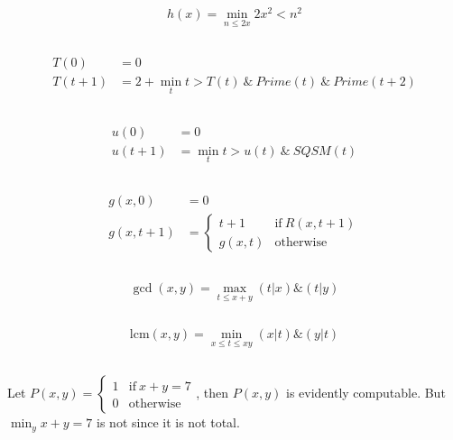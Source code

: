 \subsection{}
\[ h(x) = \min_{n\le 2x}{2x^2<n^2} \]

\subsection{}
\begin{align*}
  T(0)   & = 0 \\
  T(t+1) & = 2 + \min_{t}t>T(t) \ \&\ Prime(t) \ \&\ Prime(t+2)
\end{align*}


\subsection{}
\begin{align*}
  u(0)   & = 0 \\
  u(t+1) & = \min_{t}t>u(t) \ \&\ SQSM(t)
\end{align*}


\subsection{}
\begin{align*}
  g(x,0)   & = 0 \\
  g(x,t+1) & = 
    \begin{cases}
      t+1    & \mathrm{if}\ R(x,t+1) \\
      g(x,t) & \mathrm{otherwise}
    \end{cases}
\end{align*}


\subsection{}
\[ \gcd(x,y) = \max_{t\le x+y}{(t|x)\&(t|y)} \]

\subsection{}
\[ \mathrm{lcm}(x,y) = \min_{x\le t\le xy}{(x|t)\&(y|t)} \]


\subsection{}
Let $ P(x,y) = 
\begin{cases}
  1 & \mathrm{if}\ x+y=7 \\
  0 & \mathrm{otherwise}
\end{cases} $, then $ P(x,y) $ is evidently computable. But 
$ \min_{y}{x+y=7} $ is not since it is not total.


